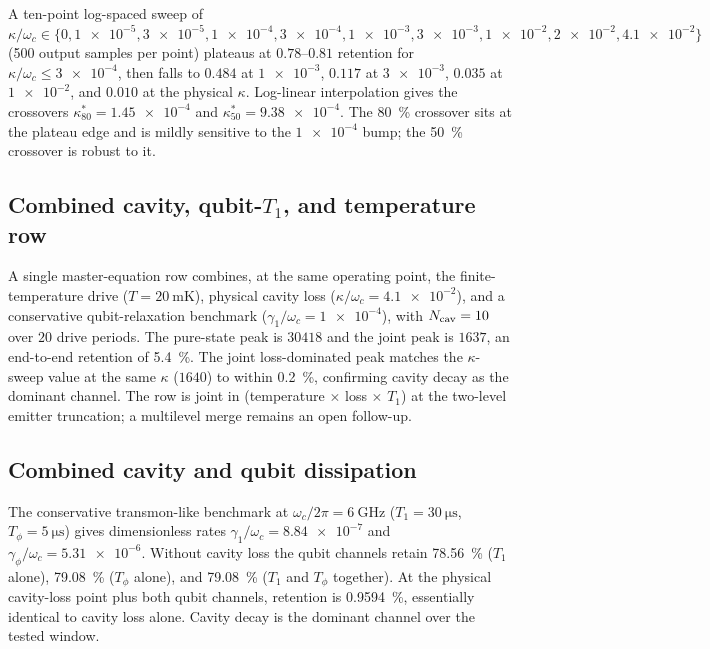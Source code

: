 \documentclass[aps,prxquantum,preprint,superscriptaddress,amsmath,amssymb]{revtex4-2}
\begin{document}
A ten-point log-spaced sweep of $\kappa/\omega_c\in\{0,\num{1e-5},\num{3e-5},\num{1e-4},\num{3e-4},\num{1e-3},\num{3e-3},\num{1e-2},\num{2e-2},\num{4.1e-2}\}$ (\num{500} output samples per point) plateaus at $0.78$--$0.81$ retention for $\kappa/\omega_c\le\num{3e-4}$, then falls to $0.484$ at $\num{1e-3}$, $0.117$ at $\num{3e-3}$, $0.035$ at $\num{1e-2}$, and $0.010$ at the physical $\kappa$. Log-linear interpolation gives the crossovers $\kappa^{\ast}_{80}=\num{1.45e-4}$ and $\kappa^{\ast}_{50}=\num{9.38e-4}$. The \qty{80}{\percent} crossover sits at the plateau edge and is mildly sensitive to the $\num{1e-4}$ bump; the \qty{50}{\percent} crossover is robust to it.

\subsection{Combined cavity, qubit-$T_1$, and temperature row}
\label{sec:si_joint_row}

A single master-equation row combines, at the same operating point, the finite-temperature drive ($T=\qty{20}{\milli\kelvin}$), physical cavity loss ($\kappa/\omega_c=\num{4.1e-2}$), and a conservative qubit-relaxation benchmark ($\gamma_1/\omega_c=\num{1e-4}$), with $N_{\rm cav}=\num{10}$ over $20$ drive periods. The pure-state peak is $\num{30418}$ and the joint peak is $\num{1637}$, an end-to-end retention of \qty{5.4}{\percent}. The joint loss-dominated peak matches the $\kappa$-sweep value at the same $\kappa$ ($\num{1640}$) to within \qty{0.2}{\percent}, confirming cavity decay as the dominant channel. The row is joint in (temperature $\times$ loss $\times$ $T_1$) at the two-level emitter truncation; a multilevel merge remains an open follow-up.

\subsection{Combined cavity and qubit dissipation}
\label{sec:si_qubit_loss}

The conservative transmon-like benchmark at $\omega_c/2\pi=\qty{6}{\giga\hertz}$ ($T_1=\qty{30}{\micro\second}$, $T_\phi=\qty{5}{\micro\second}$) gives dimensionless rates $\gamma_1/\omega_c=\num{8.84e-7}$ and $\gamma_\phi/\omega_c=\num{5.31e-6}$. Without cavity loss the qubit channels retain \qty{78.56}{\percent} ($T_1$ alone), \qty{79.08}{\percent} ($T_\phi$ alone), and \qty{79.08}{\percent} ($T_1$ and $T_\phi$ together). At the physical cavity-loss point plus both qubit channels, retention is \qty{0.9594}{\percent}, essentially identical to cavity loss alone. Cavity decay is the dominant channel over the tested window.
\end{document}
